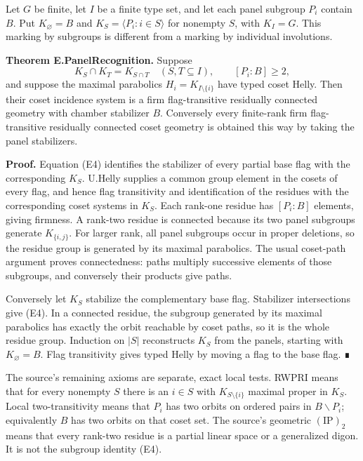 \documentclass[
  11pt,
  a4paper,
]{article}
\newcounter{none} %
\begin{document}
Let \(G\) be finite, let \(I\) be a finite type set, and let each panel
subgroup \(P_i\) contain \(B\). Put \(K_\varnothing=B\) and
\(K_S=\langle P_i:i\in S\rangle\) for nonempty \(S\), with \(K_I=G\).
This marking by subgroups is different from a marking by individual
involutions.

\textbf{Theorem E.PanelRecognition.} Suppose \[
K_S\cap K_T=K_{S\cap T}\quad(S,T\subseteq I),\qquad [P_i:B]\ge2,
\tag{E4}
\] and suppose the maximal parabolics \(H_i=K_{I\setminus\{i\}}\) have
typed coset Helly. Then their coset incidence system is a firm
flag-transitive residually connected geometry with chamber stabilizer
\(B\). Conversely every finite-rank firm flag-transitive residually
connected coset geometry is obtained this way by taking the panel
stabilizers.

\textbf{Proof.} Equation (E4) identifies the stabilizer of every partial
base flag with the corresponding \(K_S\). U.Helly supplies a common
group element in the cosets of every flag, and hence flag transitivity
and identification of the residues with the corresponding coset systems
in \(K_S\). Each rank-one residue has \([P_i:B]\) elements, giving
firmness. A rank-two residue is connected because its two panel
subgroups generate \(K_{\{i,j\}}\). For larger rank, all panel subgroups
occur in proper deletions, so the residue group is generated by its
maximal parabolics. The usual coset-path argument proves connectedness:
paths multiply successive elements of those subgroups, and conversely
their products give paths.

Conversely let \(K_S\) stabilize the complementary base flag. Stabilizer
intersections give (E4). In a connected residue, the subgroup generated
by its maximal parabolics has exactly the orbit reachable by coset
paths, so it is the whole residue group. Induction on \(|S|\)
reconstructs \(K_S\) from the panels, starting with \(K_\varnothing=B\).
Flag transitivity gives typed Helly by moving a flag to the base flag. ∎

The source's remaining axioms are separate, exact local tests. RWPRI
means that for every nonempty \(S\) there is an \(i\in S\) with
\(K_{S\setminus\{i\}}\) maximal proper in \(K_S\). Local
two-transitivity means that \(P_i\) has two orbits on ordered pairs in
\(B\backslash P_i\); equivalently \(B\) has two orbits on that coset
set. The source's geometric \((\mathrm{IP})_2\) means that every
rank-two residue is a partial linear space or a generalized digon. It is
not the subgroup identity (E4).
\end{document}
